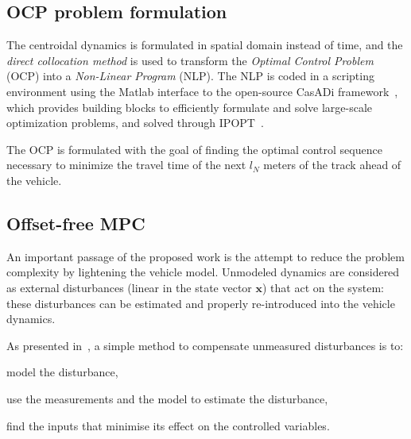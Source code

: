 \documentclass[conference]{IEEEtran} %
\renewcommand{\vec}[1]{\boldsymbol{#1}}
\begin{document}


\subsection{OCP problem formulation}

The centroidal dynamics is formulated in spatial domain instead of time, and the \emph{direct collocation method} is used to transform the \emph{Optimal Control Problem} (OCP) into a \emph{Non-Linear Program} (NLP). The NLP is coded in a scripting environment using the Matlab interface to the open-source CasADi framework~\cite{Andersson2019}, which provides building
blocks to efficiently formulate and solve large-scale optimization problems, and solved through IPOPT~\cite{Wachter2006}.

The OCP is formulated with the goal of finding the optimal control sequence necessary to minimize the travel time of the next $l_N$ meters of the track ahead of the vehicle.

\subsection{Offset-free MPC}
\label{sec:offsetfree}

An important passage of the proposed work is the attempt to reduce the problem complexity by lightening the vehicle model.
Unmodeled dynamics are considered as external disturbances (linear in the state vector $\vec x$) that act on the system: these disturbances can be estimated and properly re-introduced into the vehicle dynamics.

As presented in~\cite{Pannocchia2015}, a simple method to compensate unmeasured disturbances is to:
\begin{enumerate*}[label=(\roman*)]
	\item model the disturbance,
	\item use the measurements and the model to estimate the disturbance,
	\item find the inputs that minimise its effect on the controlled variables.
\end{enumerate*}
\end{document}
